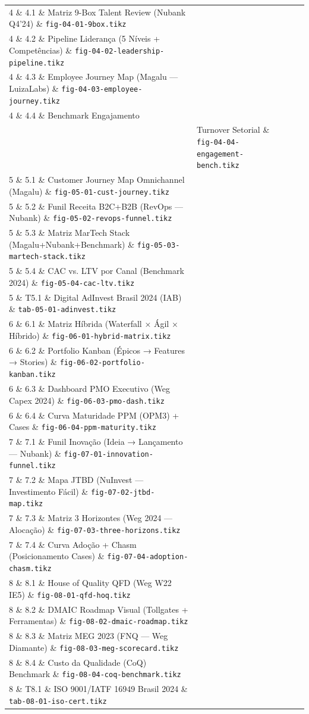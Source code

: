 \begin{longtable}{p{1.5cm}p{4cm}p{5.5cm}p{4cm}}
4 \& 4.1 \& Matriz 9-Box Talent Review (Nubank Q4'24) \& \texttt{fig-04-01-9box.tikz}\\
4 \& 4.2 \& Pipeline Liderança (5 Níveis + Competências) \& \texttt{fig-04-02-leadership-pipeline.tikz}\\
4 \& 4.3 \& Employee Journey Map (Magalu — LuizaLabs) \& \texttt{fig-04-03-employee-journey.tikz}\\
4 \& 4.4 \& Benchmark Engajamento \\& Turnover Setorial \& \texttt{fig-04-04-engagement-bench.tikz}\\

5 \& 5.1 \& Customer Journey Map Omnichannel (Magalu) \& \texttt{fig-05-01-cust-journey.tikz}\\
5 \& 5.2 \& Funil Receita B2C+B2B (RevOps — Nubank) \& \texttt{fig-05-02-revops-funnel.tikz}\\
5 \& 5.3 \& Matriz MarTech Stack (Magalu+Nubank+Benchmark) \& \texttt{fig-05-03-martech-stack.tikz}\\
5 \& 5.4 \& CAC vs. LTV por Canal (Benchmark 2024) \& \texttt{fig-05-04-cac-ltv.tikz}\\
5 \& T5.1 \& Digital AdInvest Brasil 2024 (IAB) \& \texttt{tab-05-01-adinvest.tikz}\\

6 \& 6.1 \& Matriz Híbrida (Waterfall × Ágil × Híbrido) \& \texttt{fig-06-01-hybrid-matrix.tikz}\\
6 \& 6.2 \& Portfolio Kanban (Épicos → Features → Stories) \& \texttt{fig-06-02-portfolio-kanban.tikz}\\
6 \& 6.3 \& Dashboard PMO Executivo (Weg Capex 2024) \& \texttt{fig-06-03-pmo-dash.tikz}\\
6 \& 6.4 \& Curva Maturidade PPM (OPM3) + Cases \& \texttt{fig-06-04-ppm-maturity.tikz}\\

7 \& 7.1 \& Funil Inovação (Ideia → Lançamento — Nubank) \& \texttt{fig-07-01-innovation-funnel.tikz}\\
7 \& 7.2 \& Mapa JTBD (NuInvest — Investimento Fácil) \& \texttt{fig-07-02-jtbd-map.tikz}\\
7 \& 7.3 \& Matriz 3 Horizontes (Weg 2024 — Alocação) \& \texttt{fig-07-03-three-horizons.tikz}\\
7 \& 7.4 \& Curva Adoção + Chasm (Posicionamento Cases) \& \texttt{fig-07-04-adoption-chasm.tikz}\\

8 \& 8.1 \& House of Quality QFD (Weg W22 IE5) \& \texttt{fig-08-01-qfd-hoq.tikz}\\
8 \& 8.2 \& DMAIC Roadmap Visual (Tollgates + Ferramentas) \& \texttt{fig-08-02-dmaic-roadmap.tikz}\\
8 \& 8.3 \& Matriz MEG 2023 (FNQ — Weg Diamante) \& \texttt{fig-08-03-meg-scorecard.tikz}\\
8 \& 8.4 \& Custo da Qualidade (CoQ) Benchmark \& \texttt{fig-08-04-coq-benchmark.tikz}\\
8 \& T8.1 \& ISO 9001/IATF 16949 Brasil 2024 \& \texttt{tab-08-01-iso-cert.tikz}\\


\end{longtable}
